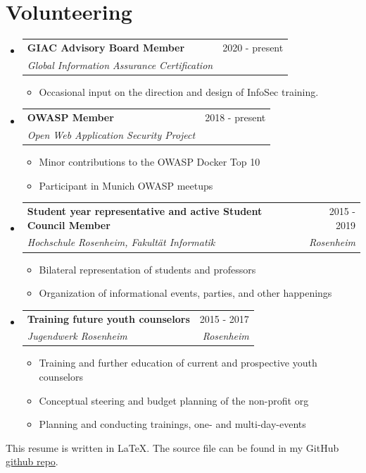 \documentclass[letterpaper,11pt]{article}
\makeatletter
\newcommand{\resumeItemWithoutHeadline}[1]{
	\item\small{
		{#1 \vspace{-2pt}}
	}
}
\newcommand{\resumeSubheading}[4]{
  \vspace{-1pt}\item
    \begin{tabular*}{0.97\textwidth}[t]{l@{\extracolsep{\fill}}r}
      \textbf{#1} & #2 \\
      \textit{\small#3} & \textit{\small #4} \\
    \end{tabular*}\vspace{-5pt}
}
\newcommand{\resumeSubHeadingListStart}{\begin{itemize}[leftmargin=*]}
\newcommand{\resumeSubHeadingListEnd}{\end{itemize}}
\newcommand{\resumeItemListStart}{\begin{itemize}}
\newcommand{\resumeItemListEnd}{\end{itemize}\vspace{-5pt}}
\makeatother
\begin{document}
\section{Volunteering}
  \resumeSubHeadingListStart  
  	
  	\resumeSubheading
  	{GIAC Advisory Board Member}{2020 - present}
  	{Global Information Assurance Certification}{}
  	\resumeItemListStart
  		\resumeItemWithoutHeadline
  		{Occasional input on the direction and design of InfoSec training.}
  	\resumeItemListEnd
  	
  	\resumeSubheading
  	{OWASP Member}{2018 - present}
  	{Open Web Application Security Project}{}
  	\resumeItemListStart
  		\resumeItemWithoutHeadline
  		{Minor contributions to the OWASP Docker Top 10}
  		\resumeItemWithoutHeadline
  		{Participant in Munich OWASP meetups}
  	\resumeItemListEnd
  	  
	\resumeSubheading
	{Student year representative and active Student Council Member}{2015 - 2019}
	{Hochschule Rosenheim, Fakultät Informatik}{Rosenheim}
	\resumeItemListStart
		\resumeItemWithoutHeadline
		{Bilateral representation of students and professors}
		\resumeItemWithoutHeadline
		{Organization of informational events, parties, and other happenings}
	\resumeItemListEnd
	
	\resumeSubheading
	{Training future youth counselors}{2015 - 2017}
	{Jugendwerk Rosenheim}{Rosenheim}
	\resumeItemListStart
		\resumeItemWithoutHeadline
		{Training and further education of current and prospective youth counselors}
		\resumeItemWithoutHeadline
		{Conceptual steering and budget planning of the non-profit org}
		\resumeItemWithoutHeadline
		{Planning and conducting trainings, one- and multi-day-events}
	\resumeItemListEnd
	
  \resumeSubHeadingListEnd

\raggedleft 
\tiny{This resume is written in LaTeX. The source file can be found in my GitHub \href{https://github.com/gramsimamsi/resume/blob/master/lukas_grams_resume.tex}{github repo}.}
\end{document}
